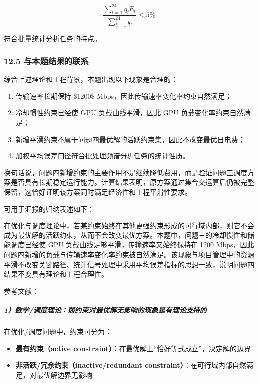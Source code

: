 \documentclass[
]{article}
\newenvironment{Shaded}{}{}
\newcommand{\NormalTok}[1]{#1}
\begin{document}
\[\frac{\sum_{t=1}^{24}q_tE_t}{\sum_{t=1}^{24}q_t}\le 5\%\]

符合批量统计分析任务的特点。

\subsubsection{12.5
与本题结果的联系}\label{125-ux4e0eux672cux9898ux7ed3ux679cux7684ux8054ux7cfb}

综合上述理论和工程背景，本题出现以下现象是合理的：

\begin{enumerate}
\def\labelenumi{\arabic{enumi}.}
\item
  传输速率长期保持 \$1200\$ Mbps，因此传输速率变化率约束自然满足；
\item
  冷却惯性约束已经使 GPU 负载曲线平滑，因此 GPU 负载变化率约束自然满足；
\item
  新增平滑约束不属于问题四最优解的活跃约束集，因此不改变最优日电费；
\item
  加权平均误差口径符合批处理频谱分析任务的统计性质。
\end{enumerate}

换句话说，问题四新增约束的主要作用不是继续降低费用，而是验证问题三调度方案是否具有长期稳定运行能力。计算结果表明，原方案通过集合交运算后仍被完整保留，这恰好证明该方案同时满足经济性和工程平滑性要求。

可用于汇报的归纳表述如下：

\begin{Shaded}
\begin{Highlighting}[]
\NormalTok{在优化与调度理论中，若某约束始终在其他更强约束形成的可行域内部，则它不会成为最优解的活跃约束，从而不会改变最优方案。本题中，问题三的冷却惯性和储能调度已经使 GPU 负载曲线足够平滑，传输速率又始终保持在 1200 Mbps，因此问题四新增的负载与传输速率变化率约束被自然满足。该现象与项目管理中的资源平滑不改变关键路径、统计信号处理中采用平均误差指标的思想一致，说明问题四结果不变具有理论和工程合理性。}
\end{Highlighting}
\end{Shaded}

参考文献：

\subparagraph{1）数学/调度理论：弱约束对最优解无影响的现象是有理论支持的}\label{1uxff09ux6570ux5b66ux8c03ux5ea6ux7406ux8bbaux5f31ux7ea6ux675fux5bf9ux6700ux4f18ux89e3ux65e0ux5f71ux54cdux7684ux73b0ux8c61ux662fux6709ux7406ux8bbaux652fux6301ux7684}

在优化/调度问题中，约束可分为：

\begin{itemize}
\item
  \textbf{最有约束（active
  constraint）}：在最优解上``恰好等式成立''，决定解的边界
\item
  \textbf{非活跃/冗余约束（inactive/redundant
  constraint）}：在可行域内部自然满足，对最优解边界无影响
\end{itemize}
\end{document}
